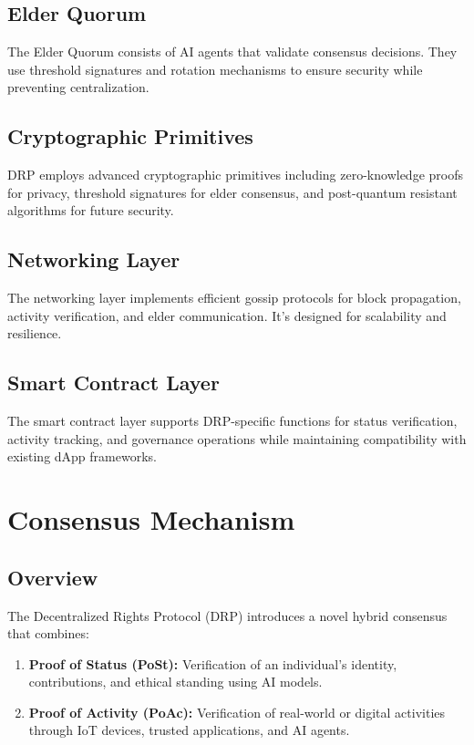 \documentclass[11pt,a4paper]{article}
\begin{document}
\subsection{Elder Quorum}
The Elder Quorum consists of AI agents that validate consensus decisions. They use threshold signatures and rotation mechanisms to ensure security while preventing centralization.

\subsection{Cryptographic Primitives}
DRP employs advanced cryptographic primitives including zero-knowledge proofs for privacy, threshold signatures for elder consensus, and post-quantum resistant algorithms for future security.

\subsection{Networking Layer}
The networking layer implements efficient gossip protocols for block propagation, activity verification, and elder communication. It's designed for scalability and resilience.

\subsection{Smart Contract Layer}
The smart contract layer supports DRP-specific functions for status verification, activity tracking, and governance operations while maintaining compatibility with existing dApp frameworks.


\section{Consensus Mechanism}

\subsection{Overview}
The Decentralized Rights Protocol (DRP) introduces a novel hybrid consensus that combines:
\begin{enumerate}
    \item \textbf{Proof of Status (PoSt):} Verification of an individual's identity, contributions, and ethical standing using AI models.
    \item \textbf{Proof of Activity (PoAc):} Verification of real-world or digital activities through IoT devices, trusted applications, and AI agents.
\end{enumerate}
\end{document}
